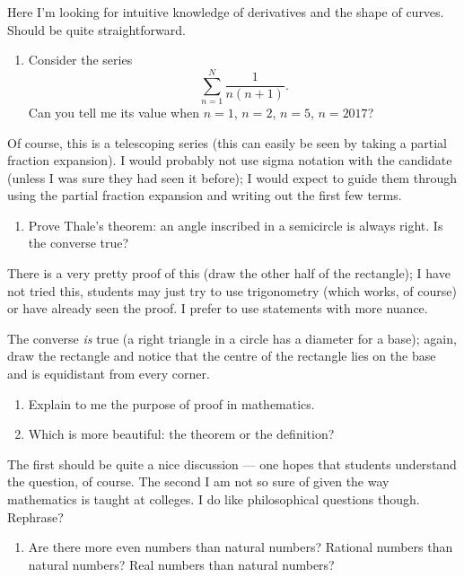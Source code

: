 \documentclass{amsart}
\begin{document}
Here I'm looking for intuitive knowledge of derivatives and the shape of curves. Should be quite straightforward.

\filbreak\begin{enumerate}[resume]\bfseries
  \item Consider the series
        \begin{displaymath}
          \sum_{n = 1}^N \frac{1}{n(n + 1)}.
        \end{displaymath}
        Can you tell me its value when $ n = 1 $, $ n = 2 $, $ n = 5 $, $ n = 2017 $?
\end{enumerate}

Of course, this is a telescoping series (this can easily be seen by taking a partial fraction expansion). I would probably
not use sigma notation with the candidate (unless I was sure they had seen it before); I would expect to guide them through
using the partial fraction expansion and writing out the first few terms.

\filbreak\begin{enumerate}[resume]\bfseries
  \item Prove Thale's theorem: an angle inscribed in a semicircle is always right. Is the converse true?
\end{enumerate}

There is a very pretty proof of this (draw the other half of the rectangle); I have not tried this, students may just
try to use trigonometry (which works, of course) or have already seen the proof. I prefer to use statements with more nuance.

The converse \emph{is} true (a right triangle in a circle has a diameter for a base); again, draw the rectangle and notice that the centre of
the rectangle lies on the base and is equidistant from every corner.

\filbreak\begin{enumerate}[resume]\bfseries
  \item Explain to me the purpose of proof in mathematics.
  \item Which is more beautiful: the theorem or the definition?
\end{enumerate}

The first should be quite a nice discussion --- one hopes that students understand the question, of course. The second I am
not so sure of given the way mathematics is taught at colleges. I do like philosophical questions though. Rephrase?

\filbreak\begin{enumerate}[resume]\bfseries
  \item Are there more even numbers than natural numbers? Rational numbers than natural numbers? Real numbers than natural numbers?
\end{enumerate}
\end{document}
